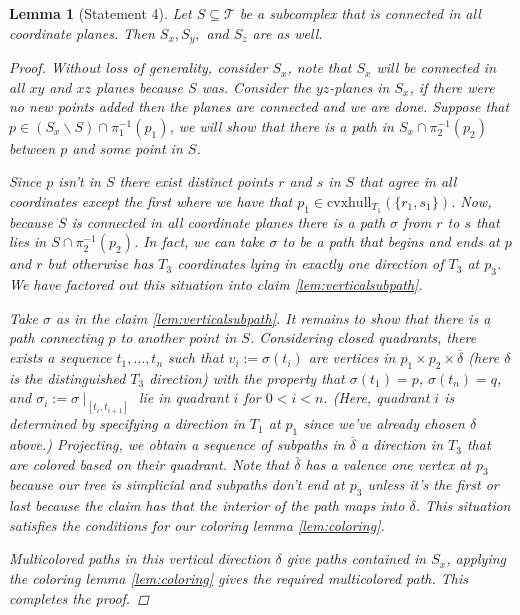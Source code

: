 \documentclass{article}
\theoremstyle{mystyle}
\newtheorem{lem}{Lemma}[section]
\theoremstyle{remark}
\begin{document}
\begin{lem}
    [Statement 4]
    Let \(S \subseteq \mathscr{T}\) be a subcomplex that is connected in all coordinate planes. Then \(S_{x}, S_{y},\) and \(S_{z}\) are as well. 
    \begin{proof}
        Without loss of generality, consider \(S_{ x}\), note that \(S_{x}\) will be connected in all \(xy\) and \(xz\) planes because \(S\) was. Consider the \(yz\)-planes in \(S_{x}\), if there were no new points added then the planes are connected and we are done. Suppose that \( p \in (S_{x} \smallsetminus S ) \cap \pi^{-1} _{1} (p_{1} )\), we will show that there is a path in \(S_{x} \cap \pi_{2}^{-1} (p_{2} )\) between \(p\) and some point in \(S\).
       
        Since \(p\) isn't in \(S\) there exist distinct points \(r\) and \(s\) in \(S \) that agree in all coordinates except the first where we have that \(p_{1} \in \text{cvxhull}_{T_{1}}  (\{r_{1} , s_{1}\})\). Now, because \(S\) is connected in all coordinate planes there is a path \(\sigma\) from \(r\) to \(s\) that lies in \(S \cap \pi_{2}^{-1} (p_{2})\). In fact, we can take \(\sigma\) to be a path that begins and ends at \(p\) and \(r\) but otherwise has \(T_{3}\) coordinates lying in exactly one direction of \(T_{3}\) at \(p_{3}\). We have factored out this situation into claim \ref{lem:verticalsubpath}.  

        Take \(\sigma\) as in the claim \ref{lem:verticalsubpath}. It remains to show that there is a path connecting \(p\) to another point in \(S\). Considering closed quadrants, there exists a sequence \(t_{1},\ldots,t_{n}\) such that \(v_i:=\sigma (t_i)\) are vertices in \(p_{1} \times p_{2} \times \overline\delta\)  (here \(\delta\) is the distinguished \(T_{3}\)  direction) with the property that \(\sigma (t_{1}) =p\), \(\sigma (t_{n}) = q\), and \(\sigma_{i} := \sigma \mid_{[t_{i} , t_{i + 1} ]}\) lie in quadrant \(i\) for \(0 < i < n\). (Here, quadrant \(i\) is determined by specifying a direction in \(T_{1}\) at \(p_{1}\) since we've already chosen \(\delta\) above.) Projecting, we obtain a sequence of subpaths in \(\overline\delta\) a direction in \(T_{3}\) that are colored based on their quadrant. Note that \(\overline \delta\) has a valence one vertex at \(p_{3}\) because our tree is simplicial and subpaths don't end at \(p_{3}\) unless it's the first or last because the claim has that the interior of the path maps into \(\delta\). This situation satisfies the conditions for our coloring lemma \ref{lem:coloring}.
        
        Multicolored paths in this vertical direction \(\delta\)  give paths contained in \(S_{x}\), applying the coloring lemma \ref{lem:coloring} gives the required multicolored path. This completes the proof.
    \end{proof}
\end{lem}
\end{document}
